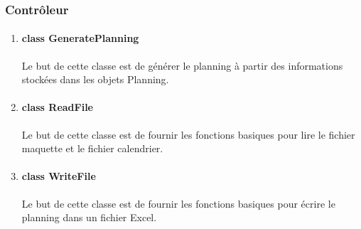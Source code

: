 \documentclass{polytech/polytech}
\begin{document}
	\subsubsection{Contrôleur}
		\begin{enumerate}
			\item \paragraph{class GeneratePlanning}
			Le but de cette classe est de générer le planning à partir des informations stockées dans les objets Planning.

			\item \paragraph{class ReadFile}
			Le but de cette classe est de fournir les fonctions basiques pour lire le fichier maquette et le fichier calendrier.

			\item \paragraph{class WriteFile}
			Le but de cette classe est de fournir les fonctions basiques pour écrire le planning dans un fichier Excel.


\end{enumerate}
\end{document}
